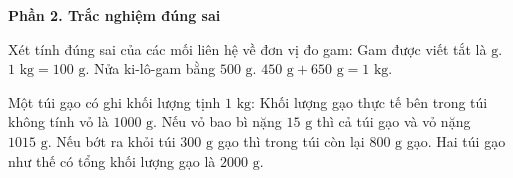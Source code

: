 \textbf{Phần 2. Trắc nghiệm đúng sai}

\begin{ex} %
Xét tính đúng sai của các mối liên hệ về đơn vị đo gam:
\choiceTF
{\True Gam được viết tắt là $\text{g}$.}
{$1\text{ kg} = 100\text{ g}$.}
{\True Nửa ki-lô-gam bằng $500\text{ g}$.}
{$450\text{ g} + 650\text{ g} = 1\text{ kg}$.}
\end{ex}

\begin{ex} %
Một túi gạo có ghi khối lượng tịnh $1\text{ kg}$:
\choiceTF
{\True Khối lượng gạo thực tế bên trong túi không tính vỏ là $1000\text{ g}$.}
{\True Nếu vỏ bao bì nặng $15\text{ g}$ thì cả túi gạo và vỏ nặng $1015\text{ g}$.}
{Nếu bớt ra khỏi túi $300\text{ g}$ gạo thì trong túi còn lại $800\text{ g}$ gạo.}
{\True Hai túi gạo như thế có tổng khối lượng gạo là $2000\text{ g}$.}
\end{ex}

